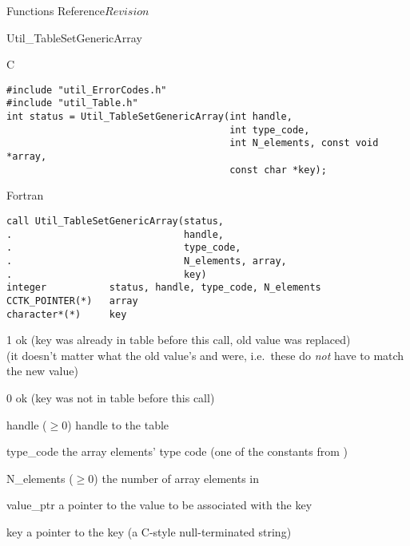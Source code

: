 \begin{cactuspart}{ Functions Reference}{}{$Revision$}
\begin{FunctionDescription}{Util\_TableSetGenericArray}
\begin{SynopsisSection}
\begin{Synopsis}{C}
\begin{verbatim}
#include "util_ErrorCodes.h"
#include "util_Table.h"
int status = Util_TableSetGenericArray(int handle,
                                       int type_code,
                                       int N_elements, const void *array,
                                       const char *key);
\end{verbatim}
\end{Synopsis}
\begin{Synopsis}{Fortran}
\begin{verbatim}
call Util_TableSetGenericArray(status,
.                              handle,
.                              type_code,
.                              N_elements, array,
.                              key)
integer           status, handle, type_code, N_elements
CCTK_POINTER(*)   array
character*(*)     key
\end{verbatim}
\end{Synopsis}
\end{SynopsisSection}

\begin{ResultSection}
\begin{Result}{\rm 1}
ok (key was already in table before this call, old value was replaced)\\
   (it doesn't matter what the old value's  and
     were, i.e.\ these do {\em not\/} have to match
    the new value)
\end{Result}
\begin{Result}{\rm 0}
ok (key was not in table before this call)
\end{Result}
\end{ResultSection}

\begin{ParameterSection}
\begin{Parameter}{handle ($\ge 0$)}
handle to the table
\end{Parameter}
\begin{Parameter}{type\_code}
the array elements' type code
(one of the  constants from )
\end{Parameter}
\begin{Parameter}{N\_elements ($\ge 0$)}
the number of array elements in 
\end{Parameter}
\begin{Parameter}{value\_ptr}
a pointer to the value to be associated with the key
\end{Parameter}
\begin{Parameter}{key}
a pointer to the key (a C-style null-terminated string)
\end{Parameter}
\end{ParameterSection}


\end{FunctionDescription}
\end{cactuspart}
